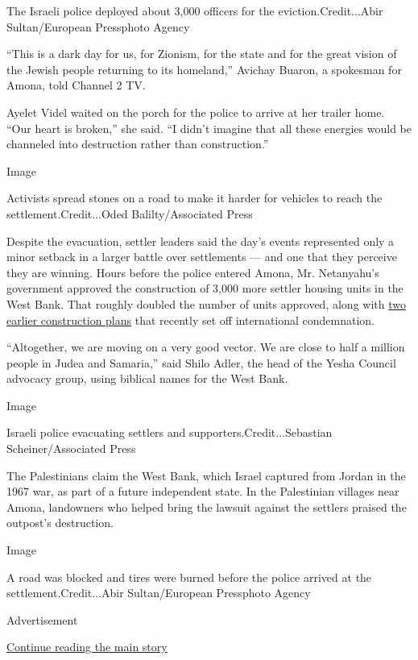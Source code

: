 The Israeli police deployed about 3,000 officers for the
eviction.Credit...Abir Sultan/European Pressphoto Agency

``This is a dark day for us, for Zionism, for the state and for the
great vision of the Jewish people returning to its homeland,'' Avichay
Buaron, a spokesman for Amona, told Channel 2 TV.

Ayelet Videl waited on the porch for the police to arrive at her trailer
home. ``Our heart is broken,'' she said. ``I didn't imagine that all
these energies would be channeled into destruction rather than
construction.''

Image

Activists spread stones on a road to make it harder for vehicles to
reach the settlement.Credit...Oded Balilty/Associated Press

Despite the evacuation, settler leaders said the day's events
represented only a minor setback in a larger battle over settlements ---
and one that they perceive they are winning. Hours before the police
entered Amona, Mr. Netanyahu's government approved the construction of
3,000 more settler housing units in the West Bank. That roughly doubled
the number of units approved, along with
\href{https://www.nytimes.com/2017/01/24/world/middleeast/israel-settlement-expansion-west-bank.html}{two
earlier construction plans} that recently set off international
condemnation.

``Altogether, we are moving on a very good vector. We are close to half
a million people in Judea and Samaria,'' said Shilo Adler, the head of
the Yesha Council advocacy group, using biblical names for the West
Bank.

Image

Israeli police evacuating settlers and supporters.Credit...Sebastian
Scheiner/Associated Press

The Palestinians claim the West Bank, which Israel captured from Jordan
in the 1967 war, as part of a future independent state. In the
Palestinian villages near Amona, landowners who helped bring the lawsuit
against the settlers praised the outpost's destruction.

Image

A road was blocked and tires were burned before the police arrived at
the settlement.Credit...Abir Sultan/European Pressphoto Agency

Advertisement

\protect\hyperlink{after-bottom}{Continue reading the main story}


